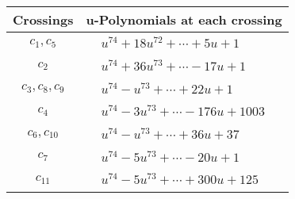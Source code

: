 \documentclass[1p]{elsarticle_modified}
\theoremstyle{definition}
\begin{document}
\begin{tabular}{m{50pt}|m{274pt}}
Crossings & \hspace{64pt}u-Polynomials at each crossing \\
\hline $$\begin{aligned}c_{1},c_{5}\end{aligned}$$&$\begin{aligned}
&u^{74}+18 u^{72}+\cdots+5 u+1
\end{aligned}$\\
\hline $$\begin{aligned}c_{2}\end{aligned}$$&$\begin{aligned}
&u^{74}+36 u^{73}+\cdots-17 u+1
\end{aligned}$\\
\hline $$\begin{aligned}c_{3},c_{8},c_{9}\end{aligned}$$&$\begin{aligned}
&u^{74}- u^{73}+\cdots+22 u+1
\end{aligned}$\\
\hline $$\begin{aligned}c_{4}\end{aligned}$$&$\begin{aligned}
&u^{74}-3 u^{73}+\cdots-176 u+1003
\end{aligned}$\\
\hline $$\begin{aligned}c_{6},c_{10}\end{aligned}$$&$\begin{aligned}
&u^{74}- u^{73}+\cdots+36 u+37
\end{aligned}$\\
\hline $$\begin{aligned}c_{7}\end{aligned}$$&$\begin{aligned}
&u^{74}-5 u^{73}+\cdots-20 u+1
\end{aligned}$\\
\hline $$\begin{aligned}c_{11}\end{aligned}$$&$\begin{aligned}
&u^{74}-5 u^{73}+\cdots+300 u+125
\end{aligned}$\\
\hline
\end{tabular}\\~\\
\newpage\renewcommand{\arraystretch}{1}
\end{document}
